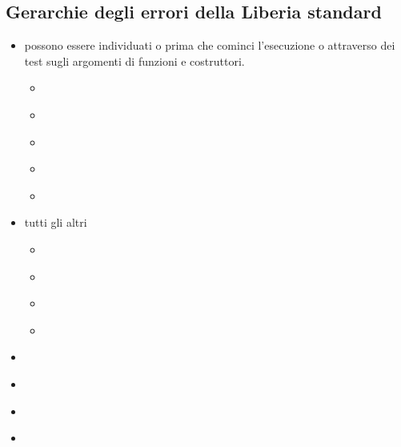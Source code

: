 \subsection{Gerarchie degli errori della Liberia standard}
\begin{itemize}
    \item \textcolor{blue}{} possono essere individuati o prima che cominci
    l’esecuzione o attraverso dei test sugli argomenti
    di funzioni e costruttori.
    \begin{itemize}
        \item \textcolor{blue}{}
        \item \textcolor{blue}{}
        \item \textcolor{blue}{}
        \item \textcolor{blue}{}
        \item \textcolor{blue}{}
    \end{itemize}
    \item  \textcolor{blue}{} tutti gli altri
    \begin{itemize}
        \item \textcolor{blue}{}
        \item \textcolor{blue}{}
        \item \textcolor{blue}{}
        \item \textcolor{blue}{}
    \end{itemize}

    \item \textcolor{blue}{}
    \item \textcolor{blue}{}
    \item \textcolor{blue}{}
    \item \textcolor{blue}{}
\end{itemize}
